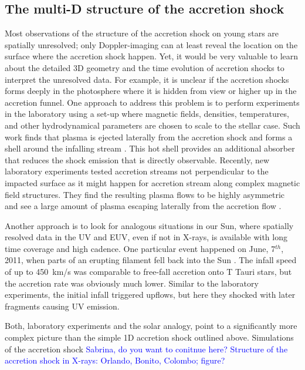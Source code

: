 \subsection{The multi-D structure of the accretion shock}

Most observations of the structure of the accretion shock on young stars are spatially unresolved; only Doppler-imaging can at least reveal the location on the surface where the accretion shock happen. Yet, it would be very valuable to learn about the detailed 3D geometry and the time evolution of accretion shocks to interpret the unresolved data. For example, it is unclear if the accretion shocks forms deeply in the photosphere where it is hidden from view or higher up in the accretion funnel. One approach to address this problem is to perform experiments in the laboratory using a set-up where magnetic fields, densities, temperatures, and other hydrodynamical parameters are chosen to scale to the stellar case. Such work finds that plasma is ejected laterally from the accretion shock and forms a shell around the infalling stream \cite{2017SciA....3E0982R} . This hot shell provides an additional absorber that reduces the shock emission that is directly observable. Recently, new laboratory experiments tested accretion streams not perpendicular to the impacted surface as it might happen for accretion stream along complex magnetic field structures. They find the resulting plasma flows to be highly asymmetric and see a large amount of plasma escaping laterally from the accretion flow \cite{2020A&A...642A..38B}.

Another approach is to look for analogous situations in our Sun, where spatially resolved data in the UV and EUV, even if not in X-rays, is available with long time coverage and high cadence. One particular event happened on June, 7$^{th}$, 2011, when parts of an erupting filament fell back into the Sun \cite{2013Sci...341..251R,2013A&A...559A.127O}. The infall speed of up to 450~km/s was comparable to free-fall accretion onto T Tauri stars, but the accretion rate was obviously much lower. Similar to the laboratory experiments, the initial infall triggered upflows, but here they shocked with later fragments causing UV emission.

Both, laboratory experiments and the solar analogy, point to a significantly more complex picture than the simple 1D accretion shock outlined above. Simulations of the accretion shock \textcolor{blue}{Sabrina, do you want to conitnue here? Structure of the accretion shock in X-rays: Orlando, Bonito, Colombo; figure?}

